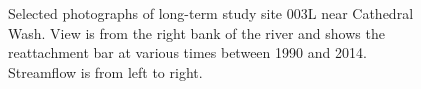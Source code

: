 \begin{figure}[t!]
\caption{Selected photographs of long-term study site 003L near Cathedral Wash.  View is from the right bank of the river and shows the reattachment bar at various times between 1990 and 2014. Streamflow is from left to right.   }
\end{figure}



\clearpage

